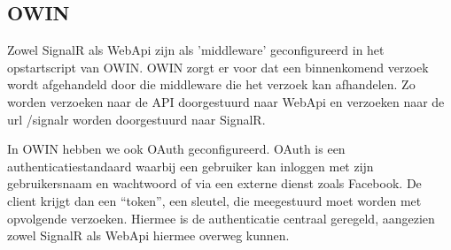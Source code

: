\subsection{OWIN}
Zowel SignalR als WebApi zijn als 'middleware' geconfigureerd in het opstartscript van OWIN. OWIN zorgt er voor dat een binnenkomend verzoek wordt afgehandeld door die middleware die het verzoek kan afhandelen. Zo worden verzoeken naar de API doorgestuurd naar WebApi en verzoeken naar de url /signalr worden doorgestuurd naar SignalR. 

In OWIN hebben we ook OAuth geconfigureerd. OAuth is een authenticatiestandaard waarbij een gebruiker kan inloggen met zijn gebruikersnaam en wachtwoord of via een externe dienst zoals Facebook. De client krijgt dan een ``token'', een sleutel, die meegestuurd moet worden met opvolgende verzoeken. Hiermee is de authenticatie centraal geregeld, aangezien zowel SignalR als WebApi hiermee overweg kunnen.